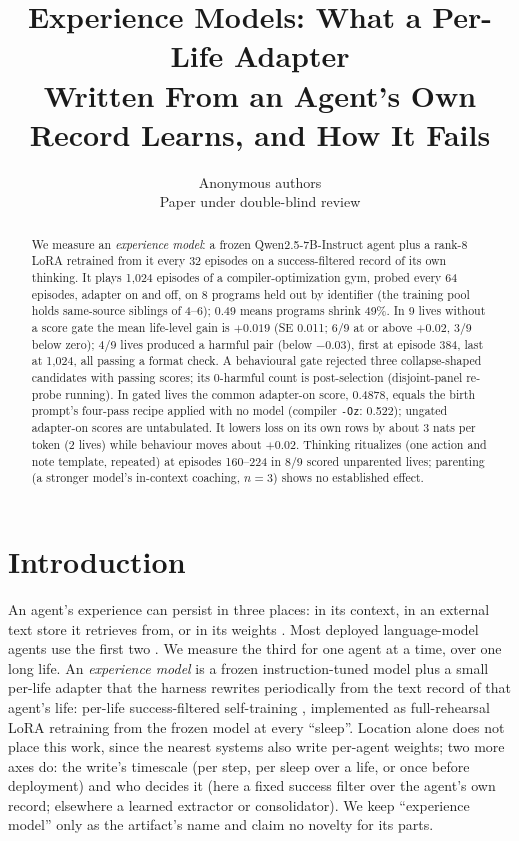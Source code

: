 \documentclass{article}
\title{Experience Models: What a Per-Life Adapter\\Written From an Agent's Own Record Learns, and How It Fails}
\author{Anonymous authors\\Paper under double-blind review}
\begin{document}
\maketitle

\begin{abstract}
We measure an \emph{experience model}: a frozen Qwen2.5-7B-Instruct agent plus a rank-8 LoRA retrained from it every 32 episodes on a success-filtered record of its own thinking. It plays 1{,}024 episodes of a compiler-optimization gym, probed every 64 episodes, adapter on and off, on 8 programs held out by identifier (the training pool holds same-source siblings of 4--6); 0.49 means programs shrink 49\%. In 9 lives without a score gate the mean life-level gain is $+0.019$ (SE 0.011; 6/9 at or above $+0.02$, 3/9 below zero); 4/9 lives produced a harmful pair (below $-0.03$), first at episode 384, last at 1{,}024, all passing a format check. A behavioural gate rejected three collapse-shaped candidates with passing scores; its 0-harmful count is post-selection (disjoint-panel re-probe running). In gated lives the common adapter-on score, 0.4878, equals the birth prompt's four-pass recipe applied with no model (compiler \texttt{-Oz}: 0.522); ungated adapter-on scores are untabulated. It lowers loss on its own rows by about 3 nats per token (2 lives) while behaviour moves about $+0.02$. Thinking ritualizes (one action and note template, repeated) at episodes 160--224 in 8/9 scored unparented lives; parenting (a stronger model's in-context coaching, $n = 3$) shows no established effect.
\end{abstract}

\section{Introduction}
\label{sec:intro}

An agent's experience can persist in three places: in its context, in an external text store it retrieves from, or in its weights \citep{dorovatas2026modular,back2026lora}. Most deployed language-model agents use the first two \citep{park2023generative,shinn2023reflexion,zhao2023expel}. We measure the third for one agent at a time, over one long life. An \emph{experience model} is a frozen instruction-tuned model plus a small per-life adapter that the harness rewrites periodically from the text record of that agent's life: per-life success-filtered self-training \citep{zelikman2022star,gulcehre2023rest,singh2023restem,anthony2017expert}, implemented as full-rehearsal LoRA \citep{hu2021lora} retraining from the frozen model at every ``sleep''. Location alone does not place this work, since the nearest systems also write per-agent weights; two more axes do: the write's timescale (per step, per sleep over a life, or once before deployment) and who decides it (here a fixed success filter over the agent's own record; elsewhere a learned extractor or consolidator). We keep ``experience model'' only as the artifact's name \citep{silver2025experience} and claim no novelty for its parts.
\end{document}
